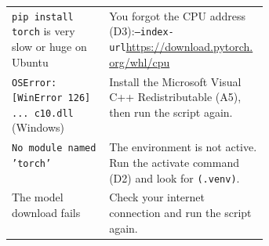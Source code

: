 \documentclass[11pt,a4paper]{article}
\begin{document}
\begin{tabularx}{\linewidth}{@{}>{\raggedright\arraybackslash}p{0.38\linewidth} X@{}}
\texttt{pip install torch} is very slow or huge on Ubuntu & You forgot the CPU address (D3):\newline \texttt{--index-url}\newline \url{https://download.pytorch.org/whl/cpu} \\
\texttt{OSError: [WinError 126]} \texttt{... c10.dll} (Windows) & Install the Microsoft Visual C++ Redistributable (A5), then run the script again. \\
\texttt{No module named 'torch'} & The environment is not active. Run the activate command (D2) and look for \texttt{(.venv)}. \\
The model download fails & Check your internet connection and run the script again. \\
\bottomrule
\end{tabularx}
\end{document}
